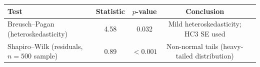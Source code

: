 \begin{tabular}{lcccl}
\toprule
Test & Statistic & $p$-value & Conclusion \\
\midrule
Breusch--Pagan (heteroskedasticity) & 4.58 & 0.032 & Mild heteroskedasticity; HC3 SE used \\
Shapiro--Wilk (residuals, $n=500$ sample) & 0.89 & $<0.001$ & Non-normal tails (heavy-tailed distribution) \\
\bottomrule
\end{tabular}